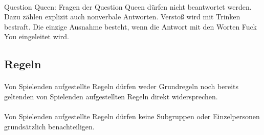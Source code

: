 \paragraph{}
Question Queen: Fragen der Question Queen dürfen nicht beantwortet werden.
Dazu zählen explizit auch nonverbale Antworten. Verstoß wird mit Trinken bestraft.
Die einzige Ausnahme besteht, wenn die Antwort mit den Worten \glqq Fuck You\grqq{} eingeleitet wird.

\subsection{Regeln}
\paragraph{}
Von Spielenden aufgestellte Regeln dürfen weder Grundregeln noch bereits geltenden von Spielenden aufgestellten Regeln direkt widersprechen.

\paragraph{}
Von Spielenden aufgestellte Regeln dürfen keine Subgruppen oder Einzelpersonen grundsätzlich benachteiligen.
